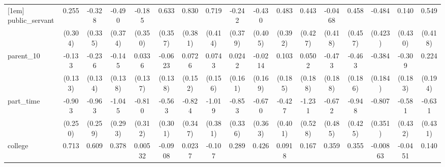 {\begin{tabular}{l*{16}{c}}
[1em]
public\_servant      &       0.255         &      -0.328         &      -0.490         &      -0.185         &       0.633         &       0.830\sym{*}  &       0.719         &      -0.242         &      -0.430         &       0.483         &       0.443         &     -0.0468         &       0.458         &      -0.484         &       0.140         &       0.549         \\
                    &     (0.304)         &     (0.335)         &     (0.374)         &     (0.350)         &     (0.357)         &     (0.381)         &     (0.414)         &     (0.379)         &     (0.405)         &     (0.392)         &     (0.427)         &     (0.418)         &     (0.457)         &     (0.423)         &     (0.430)         &     (0.418)         \\
[1em]
parent\_10           &      -0.133         &      -0.236         &      -0.145         &      0.0336         &     -0.0623         &      0.0726         &      0.0743         &      0.0242         &     -0.0214         &       0.103         &      0.0502         &      -0.473\sym{*}  &      -0.463\sym{*}  &      -0.384\sym{*}  &      -0.309         &       0.224         \\
                    &     (0.133)         &     (0.134)         &     (0.138)         &     (0.137)         &     (0.138)         &     (0.152)         &     (0.156)         &     (0.161)         &     (0.169)         &     (0.185)         &     (0.188)         &     (0.188)         &     (0.186)         &     (0.184)         &     (0.183)         &     (0.194)         \\
[1em]
part\_time           &      -0.903\sym{***}&      -0.963\sym{***}&      -1.045\sym{***}&      -0.810\sym{**} &      -0.563         &      -0.824\sym{*}  &      -1.019\sym{**} &      -0.853\sym{*}  &      -0.670         &      -0.427         &      -1.231\sym{*}  &      -0.672         &      -0.948\sym{*}  &      -0.807\sym{*}  &      -0.581         &      -0.631         \\
                    &     (0.250)         &     (0.259)         &     (0.293)         &     (0.312)         &     (0.301)         &     (0.347)         &     (0.381)         &     (0.336)         &     (0.363)         &     (0.401)         &     (0.528)         &     (0.485)         &     (0.425)         &     (0.351)         &     (0.432)         &     (0.431)         \\
[1em]
college             &       0.713\sym{***}&       0.609\sym{**} &       0.378         &     0.00532         &     -0.0908         &      0.0237         &      -0.107         &       0.289         &       0.426         &      0.0918         &       0.167         &       0.359         &       0.355         &    -0.00863         &     -0.0451         &       0.140         \\

\end{tabular}}
